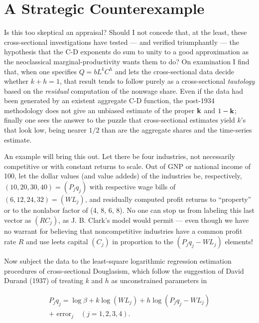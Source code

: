 \documentclass{article}
\begin{document}

\section*{A Strategic Counterexample}

Is this too skeptical an appraisal? Should I not concede that, at the least, these cross-sectional investigations have tested --- and verified triumphantly --- the hypothesis that the C-D exponents do sum to unity to a good approximation as the neoclassical marginal-productivity wants them to do? On examination I find that, when one specifies \(Q=bL^k C^h\) and lets the cross-sectional data decide whether \(k+h=1\), that result tends to follow purely as a cross-sectional \emph{tautology} based on the \emph{residual} computation of the nonwage share. Even if the data had been generated by an existent aggregate C-D function, the post-1934 methodology does not give an unbiased estimate of the proper \(\vb{k}\) and \(1-\vb{k}\); finally one sees the answer to the puzzle that cross-sectional estimates yield \(k\)'s that look low, being nearer \(1/2\) than are the aggregate shares and the time-series estimate.

An example will bring this out. Let there be four industries, not necessarily competitive or with constant returns to scale. Out of GNP or national income of 100, let the dollar values (and value addeds) of the industries be, respectively, \((10,20,30,40)=(P_j q_j )\) with respective wage bills of \((6,12,24,32)=(WL_j )\), and residually computed profit returns to ``property'' or to the nonlabor factor of (4, 8, 6, 8). No one can stop us from labeling this last vector as \((RC_j )\), as J. B. Clark's model would permit --- even though we have no warrant for believing that noncompetitive industries have a common profit rate \(R\) and use leets capital \((C_j )\) in proportion to the \((P_j q_j-WL_j )\) elements!

Now subject the data to the least-square logarithmic regression estimation procedures of cross-sectional Douglasism, which follow the suggestion of David Durand (1937) of treating \(k\) and \(h\) as unconstrained parameters in

\begin{equation}\label{eq6}
  \begin{gathered}
	P_j q_j = \log \beta +k \log {(WL_j)}+h \log {(P_j q_j-WL_j)}\\
	+\text{ error}_j\quad(j=1,2,3,4).%
  \end{gathered}
\end{equation}
\end{document}
